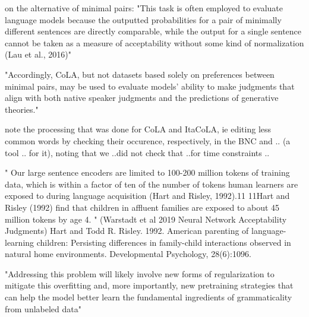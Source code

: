 on the alternative of minimal pairs:
"This task is often employed
to evaluate language models because the outputted
probabilities for a pair of minimally different sentences are directly comparable, while the output
for a single sentence cannot be taken as a measure
of acceptability without some kind of normalization (Lau et al., 2016)"

"Accordingly, CoLA, but not datasets based
solely on preferences between minimal pairs, may
be used to evaluate models’ ability to make judgments that align with both native speaker judgments and the predictions of generative theories."

note the processing that was done for CoLA and ItaCoLA, ie editing less common words by checking their occurence, respectively, in the BNC and .. (a tool .. for it), noting that we ..did not check that ..for time constraints ..

" Our large sentence encoders are limited
to 100-200 million tokens of training data, which
is within a factor of ten of the number of tokens
human learners are exposed to during language
acquisition (Hart and Risley, 1992).11 
11Hart and Risley (1992) find that children in affluent families are exposed to about 45 million tokens by age 4.
" (Warstadt et al 2019 Neural Network Acceptability Judgments)
Hart and Todd R. Risley. 1992. American parenting of language-learning children: Persisting differences in family-child interactions observed in natural home environments. Developmental Psychology, 28(6):1096.


"Addressing this problem will likely involve new forms of regularization to mitigate this overfitting and, more importantly, new pretraining
strategies that can help the model better learn the fundamental ingredients of grammaticality from unlabeled data" 



